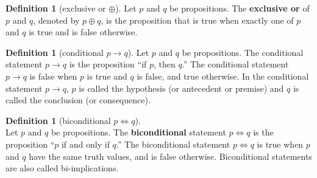 \documentclass[letterpaper,10pt]{article}
\theoremstyle{plain}
\theoremstyle{definition}
\newtheorem{defn}[thm]{Definition}
\theoremstyle{remark}
\providecommand{\lxor}{\ensuremath{\oplus}}
\begin{document}
\begin{defn}[exclusive or $\lxor$]
Let $p$ and $q$ be propositions. The \textbf{exclusive or} of $p$ and $q$, denoted by $p \lxor q$, is the proposition
that is true when exactly one of $p$ and $q$ is true and is false otherwise.
\end{defn}

\begin{defn}[conditional $p \to q$]
Let $p$ and $q$ be propositions. The conditional statement $p \to q$ is the proposition “if $p$, then
$q$.” The conditional statement $p \to q$ is false when $p$ is true and $q$ is false, and true otherwise.
In the conditional statement $p \to q$, $p$ is called the hypothesis (or antecedent or premise)
and $q$ is called the conclusion (or consequence).
\end{defn}
\begin{defn}[biconditional $p\iff q$]\ \\
Let $p$ and $q$ be propositions. The \textbf{biconditional} statement $p \iff q$ is the proposition “$p$ if
and only if $q$.” The biconditional statement $p \iff q$ is true when $p$ and $q$ have the same truth
values, and is false otherwise. Biconditional statements are also called bi-implications.
\end{defn}
\end{document}

